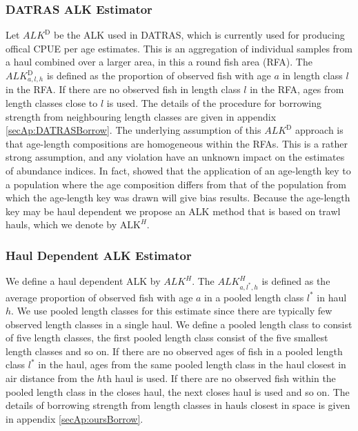 \documentclass[a4paper 12pt]{article}
\numberwithin{equation}{section}
\begin{document}
\subsubsection{DATRAS ALK Estimator }
\label{sec:datrasalkestimator}
Let $ALK^{\text{D}}$ be the ALK used in DATRAS, which is currently used for producing offical CPUE per age estimates. This is an aggregation of individual samples from a haul combined over a larger area, in this a round fish area (RFA). The $ALK^{\text{D}}_{a,l,h}$ is defined as the proportion of observed fish with age $a$ in length class $l$ in the RFA. If there are no observed fish in length class $l$ in the RFA, ages from length classes close to $l$ is used. The details of the procedure for borrowing strength from neighbouring length classes are given in appendix \ref{secAp:DATRASBorrow}. The underlying assumption of this  $ALK^{\text{D}}$ approach is that age-length compositions are homogeneous within the RFAs. This is a rather strong assumption, and any violation have an unknown impact on the estimates of abundance indices. In fact, \citet{kimura1977statistical} showed that the application of an age-length key  to a population where the age composition differs from that of the population from which the age-length key was drawn will give bias results. Because the age-length key may be haul dependent we propose an ALK method that is based on trawl hauls, which we denote by $\mathrm{ALK}^{H}$. 

\subsubsection{Haul Dependent ALK Estimator}
\label{sec:haulestimator}
We define a haul dependent ALK  by  $ALK^{H}$. The $ALK^{H}_{a,l^*,h}$ is defined as the average proportion of observed fish with age $a$ in a pooled length class $l^*$ in haul $h$. We use pooled length classes for this estimate since there are typically few observed length classes in a single haul. We define a pooled length class to consist of five length classes, the first pooled length class consist of the five smallest length classes and so on.  If there are no observed ages of fish in a pooled length class $l^*$ in the haul, ages from the same pooled length class in the haul closest in air distance from the $h$th haul is used. If there are no observed fish within the pooled length class in the closes haul, the next closes haul is used and so on.  The details of borrowing strength from length classes in hauls closest in space is given in appendix \ref{secAp:oursBorrow}. 
\end{document}
